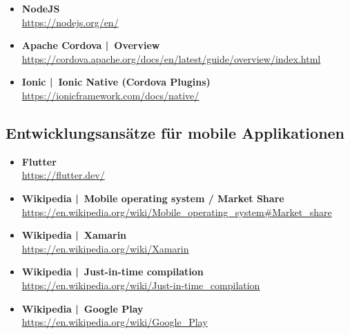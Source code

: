 \documentclass[a4paper]{article}
\begin{document}
{\begin{itemize}
		\item \textbf{NodeJS}\\
		\href{https://nodejs.org/en/}
		{https://nodejs.org/en/}
		
		\item \textbf{Apache Cordova | Overview}\\
		\href{https://cordova.apache.org/docs/en/latest/guide/overview/index.html}
		{https://cordova.apache.org/docs/en/latest/guide/overview/index.html}
		
		\item \textbf{Ionic | Ionic Native (Cordova Plugins)}\\
		\href{https://ionicframework.com/docs/native/}
		{https://ionicframework.com/docs/native/}
		
	\end{itemize}

	\subsection{Entwicklungsansätze für mobile Applikationen}
	
	\begin{itemize}
		
		\item \textbf{Flutter}\\
		\href{https://flutter.dev/}
		{https://flutter.dev/}
		
		\item \textbf{Wikipedia | Mobile operating system / Market Share}\\
		\href{https://en.wikipedia.org/wiki/Mobile_operating_system#Market_share}
		{https://en.wikipedia.org/wiki/Mobile\_operating\_system\#Market\_share}
		
		\item \textbf{Wikipedia | Xamarin}\\
		\href{https://en.wikipedia.org/wiki/Xamarin}
		{https://en.wikipedia.org/wiki/Xamarin}
		
		\item \textbf{Wikipedia | Just-in-time compilation}\\
		\href{https://en.wikipedia.org/wiki/Just-in-time_compilation}
		{https://en.wikipedia.org/wiki/Just-in-time\_compilation}
		
		\item \textbf{Wikipedia | Google Play}\\
		\href{https://en.wikipedia.org/wiki/Google_Play}
		{https://en.wikipedia.org/wiki/Google\_Play}
		

\end{itemize}}
\end{document}
